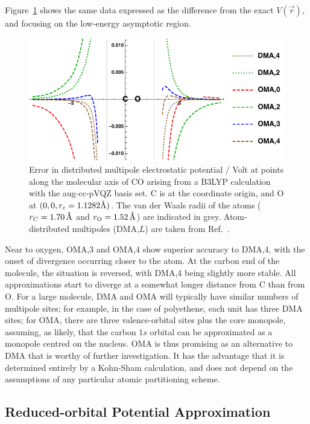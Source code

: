 \documentclass[journal=jacsat,manuscript=article]{achemso}
\begin{document}
Figure~\ref{fig:2} shows the same data expressed as the difference from the exact $V(\vec r)$, and focusing on the low-energy asymptotic region.
\begin{figure}
    \centering
    \includegraphics{fig2.pdf}
\caption{Error in distributed multipole electrostatic potential / Volt at points along the molecular axis of CO arising from a B3LYP calculation with the aug-cc-pVQZ basis set\cite{Kendall1992a}. C is at the coordinate origin, and O at $(0,0,r_e=1.1282\text\AA)$.
    The van der Waals radii of the atoms\cite{Bondi1964VanRadii} ($r_C=1.70\,\text\AA$ and $r_{\text O}=1.52\,\text\AA$) are indicated in grey.
    Atom-distributed multipoles (DMA,$L$) are taken from Ref.~.
    }
    \label{fig:2}
\end{figure}
Near to oxygen, OMA,3 and OMA,4 show superior accuracy to DMA,4, with the onset of divergence occurring closer to the atom.
At the carbon end of the molecule, the situation is reversed, with DMA,4 being slightly more stable. All approximations start to diverge at a somewhat longer distance from C than from O.
For a large molecule, DMA and OMA will typically have similar numbers of multipole sites; for example, in the case of polyethene, each  unit has three DMA sites; for OMA, there are three valence-orbital sites plus the core monopole, assuming, as likely, that the carbon $1s$ orbital can be approximated as a monopole centred on the nucleus.
OMA is thus promising as an alternative to DMA that is worthy of further investigation. It has the advantage that it is determined entirely by a Kohn-Sham calculation, and does not depend on the assumptions of any particular atomic partitioning scheme.

\subsection{Reduced-orbital Potential Approximation}
\end{document}
